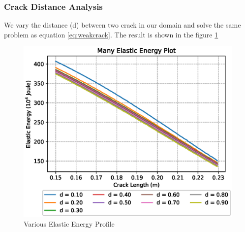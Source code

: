 \documentclass[a4paper,11pt]{article}
\begin{document}
\subsubsection{Crack Distance Analysis}
We vary the distance (d) between two crack in our domain and solve the same problem as equation \ref{eq:weakcrack}. The result is shown in the figure \ref{fig:manyelastic-lvar}
\begin{figure}[h!]
	\centering
	\includegraphics[width=0.8\linewidth]{picture/conference/manyelastic-lvar}
	\caption{Various Elastic Energy Profile}
	\label{fig:manyelastic-lvar}
\end{figure}
\end{document}
